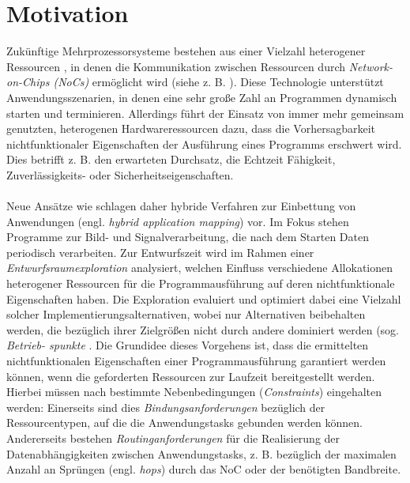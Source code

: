 \chapter{Motivation}\label{motivation}
Zukünftige Mehrprozessorsysteme bestehen aus einer Vielzahl heterogener
Ressourcen \cite{thousandCoreChips}, in denen die Kommunikation zwischen Ressourcen
durch \textit{Network-on-Chips (NoCs)} ermöglicht wird (siehe z. B. \cite{mappingNocArchitectures}). Diese Technologie
unterstützt Anwendungsszenarien, in denen eine sehr große Zahl an Programmen
dynamisch starten und terminieren. Allerdings führt der Einsatz von
immer mehr gemeinsam genutzten, heterogenen Hardwareressourcen dazu, dass
die Vorhersagbarkeit nichtfunktionaler Eigenschaften der Ausführung eines Programms
erschwert wird. Dies betrifft z. B. den erwarteten Durchsatz, die Echtzeit
Fähigkeit, Zuverlässigkeits- oder Sicherheitseigenschaften.\\
\\
Neue Ansätze wie \cite{reconfigurableArchtictures} \cite{daarm} schlagen daher hybride Verfahren zur Einbettung von
Anwendungen (engl. \textit{hybrid application mapping}) vor. Im Fokus stehen Programme
zur Bild- und Signalverarbeitung, die nach dem Starten Daten periodisch
verarbeiten. Zur Entwurfszeit wird im Rahmen einer \textit{Entwurfsraumexploration} analysiert, welchen Einfluss verschiedene Allokationen heterogener
Ressourcen für die Programmausführung auf deren nichtfunktionale Eigenschaften
haben. Die Exploration evaluiert und optimiert dabei eine Vielzahl solcher
Implementierungsalternativen, wobei nur Alternativen beibehalten werden, die
bezüglich ihrer Zielgrößen nicht durch andere dominiert werden (sog. \textit{Betrieb-
spunkte} \cite{runTimeManagement}. Die Grundidee dieses Vorgehens ist, dass die ermittelten nichtfunktionalen
Eigenschaften einer Programmausführung garantiert werden können,
wenn die geforderten Ressourcen zur Laufzeit bereitgestellt werden. Hierbei
müssen nach \cite{daarm}  bestimmte Nebenbedingungen (\textit{Constraints}) eingehalten werden:
Einerseits sind dies \textit{Bindungsanforderungen} bezüglich der Ressourcentypen,
auf die die Anwendungstasks gebunden werden können. Andererseits bestehen
\textit{Routinganforderungen} für die Realisierung der Datenabhängigkeiten zwischen
Anwendungstasks, z. B. bezüglich der maximalen Anzahl an Sprüngen (engl.
\textit{hops}) durch das NoC oder der benötigten Bandbreite.